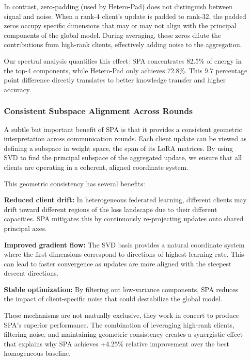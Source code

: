 \documentclass[conference]{IEEEtran}
\begin{document}
In contrast, zero-padding (used by Hetero-Pad) does not distinguish between signal and noise. When a rank-4 client's update is padded to rank-32, the padded zeros occupy specific dimensions that may or may not align with the principal components of the global model. During averaging, these zeros dilute the contributions from high-rank clients, effectively adding noise to the aggregation.

Our spectral analysis quantifies this effect: SPA concentrates 82.5\% of energy in the top-4 components, while Hetero-Pad only achieves 72.8\%. This 9.7 percentage point difference directly translates to better knowledge transfer and higher accuracy.

\subsubsection{Consistent Subspace Alignment Across Rounds}

A subtle but important benefit of SPA is that it provides a consistent geometric interpretation across communication rounds. Each client update can be viewed as defining a subspace in weight space, the span of its LoRA matrices. By using SVD to find the principal subspace of the aggregated update, we ensure that all clients are operating in a coherent, aligned coordinate system.

This geometric consistency has several benefits:

\textbf{Reduced client drift:} In heterogeneous federated learning, different clients may drift toward different regions of the loss landscape due to their different capacities. SPA mitigates this by continuously re-projecting updates onto shared principal axes.

\textbf{Improved gradient flow:} The SVD basis provides a natural coordinate system where the first dimensions correspond to directions of highest learning rate. This can lead to faster convergence as updates are more aligned with the steepest descent directions.

\textbf{Stable optimization:} By filtering out low-variance components, SPA reduces the impact of client-specific noise that could destabilize the global model.

These mechanisms are not mutually exclusive, they work in concert to produce SPA's superior performance. The combination of leveraging high-rank clients, filtering noise, and maintaining geometric consistency creates a synergistic effect that explains why SPA achieves +4.25\% relative improvement over the best homogeneous baseline.
\end{document}
